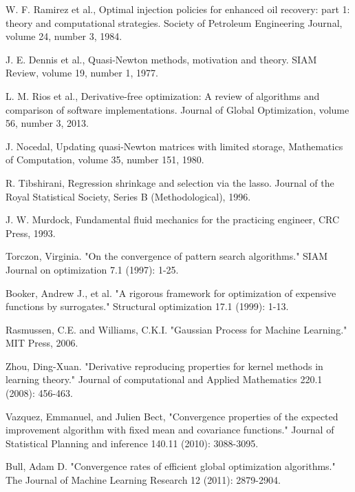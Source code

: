 \documentclass[a4paper,onecolumn]{article}
\theoremstyle{remark}
\begin{document}
\begin{thebibliography}{1}
W. F. Ramirez et al.,
Optimal injection policies for enhanced oil recovery:
part 1: theory and computational strategies.
{Society of Petroleum Engineering Journal},
volume 24, number 3, 1984.

J. E. Dennis et al.,
Quasi-Newton methods, motivation and theory.
SIAM Review,
volume 19, number 1, 1977.

L. M. Rios et al.,
Derivative-free optimization: A review of algorithms and comparison of software implementations.
{Journal of Global Optimization}, 
volume 56, number 3, 2013.

J. Nocedal,
Updating quasi-Newton matrices with limited storage,
Mathematics of Computation, 
volume 35, number 151, 1980.

R. Tibshirani,
Regression shrinkage and selection via the lasso.
{Journal of the Royal Statistical Society, Series B (Methodological)},
1996.

J. W. Murdock,
Fundamental fluid mechanics for the practicing engineer,
{CRC Press}, 1993.

Torczon, Virginia. 
"On the convergence of pattern search algorithms." 
SIAM Journal on optimization 7.1 (1997): 1-25.

Booker, Andrew J., et al. 
"A rigorous framework for optimization of expensive functions by surrogates." 
Structural optimization 17.1 (1999): 1-13.

Rasmussen, C.E. and Williams, C.K.I.
"Gaussian Process for Machine Learning."
MIT Press, 2006.

Zhou, Ding-Xuan. "Derivative reproducing properties for kernel methods in learning theory." Journal of computational and Applied Mathematics 220.1 (2008): 456-463.

Vazquez, Emmanuel, and Julien Bect,
"Convergence properties of the expected improvement algorithm with fixed mean and covariance functions." Journal of Statistical Planning and inference 140.11 (2010): 3088-3095.

Bull, Adam D. "Convergence rates of efficient global optimization algorithms." The Journal of Machine Learning Research 12 (2011): 2879-2904.


\end{thebibliography}
\end{document}
